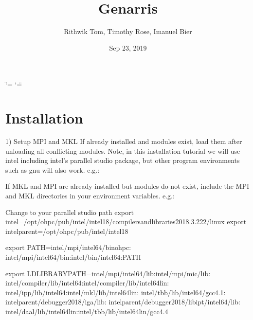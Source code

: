 \documentclass[letterpaper,10pt,english]{sphinxmanual}
\title{Genarris}
\date{Sep 23, 2019}
\author{Rithwik Tom, Timothy Rose, Imanuel Bier}
\begin{document}
\ifdefined\shorthandoff
  \ifnum\catcode`\=\string=\active\shorthandoff{=}\fi
  \ifnum\catcode`\"=\active{}\fi
\fi

\pagestyle{empty}
\sphinxmaketitle
\pagestyle{plain}
\sphinxtableofcontents
\pagestyle{normal}
\label{\detokenize{index::doc}}



\chapter{Installation}
\label{\detokenize{index:installation}}
1) Setup MPI and MKL
If already installed and modules exist, load them after unloading all conflicting modules. Note, in this installation tutorial we will use intel including intel's parallel studio package, but other program environments such as gnu will also work.
e.g.:

\begin{sphinxVerbatim}[commandchars=\\\{\}]
  
  
  
  
\end{sphinxVerbatim}

If MKL and MPI are already installed but modules do not exist, include the MPI and MKL directories in your environment variables.
e.g.:

\begin{sphinxVerbatim}[commandchars=\\\{\}]
\PYGZsh{}Change to your parallel studio path
export \PYGZdl{}intel=/opt/ohpc/pub/intel/intel18/compilers\PYGZus{}and\PYGZus{}libraries\PYGZus{}2018.3.222/linux
export \PYGZdl{}intel\PYGZus{}parent=/opt/ohpc/pub/intel/intel18

export PATH=\PYGZdq{}\PYGZdl{}intel/mpi/intel64/bin\PYGZus{}ohpc:\PYGZbs{}
\PYGZdl{}intel/mpi/intel64/bin:\PYGZdl{}intel/bin/intel64:\PYGZdl{}PATH\PYGZdq{}

export LD\PYGZus{}LIBRARY\PYGZus{}PATH=\PYGZdq{}\PYGZdl{}intel/mpi/intel64/lib:\PYGZdl{}intel/mpi/mic/lib:\PYGZbs{}
\PYGZdl{}intel/compiler/lib/intel64:\PYGZdl{}intel/compiler/lib/intel64\PYGZus{}lin:\PYGZbs{}
\PYGZdl{}intel/ipp/lib/intel64:\PYGZdl{}intel/mkl/lib/intel64\PYGZus{}lin:\PYGZbs{}
\PYGZdl{}intel/tbb/lib/intel64/gcc4.1:\PYGZbs{}
\PYGZdl{}intel\PYGZus{}parent/debugger\PYGZus{}2018/iga/lib:\PYGZbs{}
\PYGZdl{}intel\PYGZus{}parent/debugger\PYGZus{}2018/libipt/intel64/lib:\PYGZbs{}
\PYGZdl{}intel/daal/lib/intel64\PYGZus{}lin:\PYGZdl{}intel/tbb/lib/intel64\PYGZus{}lin/gcc4.4\PYGZdq{}
\end{sphinxVerbatim}
\end{document}
